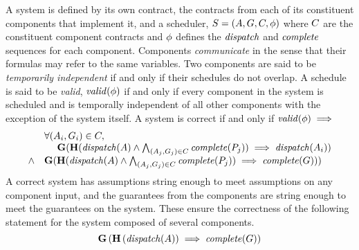 A system is defined by its own contract, the contracts from each of its constituent components that implement it, and a scheduler, $S = (A, G, C, \phi)$ where $C$ are the constituent component contracts and $\phi$ defines the $\mathit{dispatch}$ and $\mathit{complete}$ sequences for each component.
Components \emph{communicate} in the sense that their formulas may refer to the same variables.
Two components are said to be \emph{temporarily independent} if and only if their schedules do not overlap.
A schedule is said to be \emph{valid}, $\mathit{valid}(\phi)$ if and only if every component in the system is scheduled and is temporally independent of all other components with the exception of the system itself. A system is correct if and only if $\mathit{valid}(\phi) \implies$
\[
\begin{array}{ll}
  & \forall (A_i, G_i) \in C, \\
  & \ \ \ \ \mathbf{G}(\mathbf{H}(\mathit{dispatch}(A) \wedge \bigwedge_{(A_j,G_j) \in C} \mathit{complete}(P_j)) \implies \mathit{dispatch}(A_i)) \\
  \wedge & 
  \mathbf{G}(\mathbf{H}(\mathit{dispatch}(A) \wedge \bigwedge_{(A_j,G_j) \in C} \mathit{complete}(P_j)) \implies \mathit{complete}(G)))
\end{array}
\]
A correct system has assumptions string enough to meet assumptions on any component input, and the guarantees from the components are string enough to meet the guarantees on the system. These ensure the correctness of the following statement for the system composed of several components.
\[
  \mathbf{G}\left(
    \mathbf{H}\left(\mathit{dispatch}(A)\right) \implies \mathit{complete}(G) \right)
\]